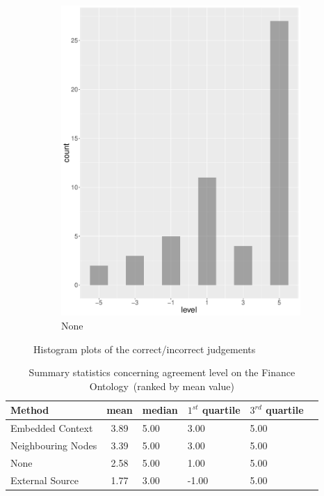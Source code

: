 \begin{figure}
\begin{subfigure}[b]{0.4\textwidth}
        \includegraphics[width=\textwidth]{plots/tennis/hist_level_none}
        \caption{None}
        \label{fig:hist_level_tennis_none}
    \end{subfigure}
    \caption{Histogram plots of the correct/incorrect judgements}\label{fig:hist_level_tennis_all}
\end{figure}


\begingroup
\renewcommand{\arraystretch}{1.5}
\begin{table}
	\begin{tabularx}{\textwidth}{l c*{4}{Y}}
		\toprule
		Method & mean & median & $1^{st}$ quartile & $3^{rd}$ quartile \\
		\midrule
		 Embedded Context & 3.89 & 5.00 & 3.00 & 5.00 \\
		 Neighbouring Nodes & 3.39 & 5.00 & 3.00 & 5.00 \\
		 None & 2.58 & 5.00 & 1.00 & 5.00 \\
		 External Source & 1.77 & 3.00 & -1.00 & 5.00 \\
		\bottomrule
	\end{tabularx}
	\caption{Summary statistics concerning agreement level on the Finance Ontology~(ranked by mean value)}
	\label{table:level_corr_incorr_tennis}
\end{table}
\endgroup